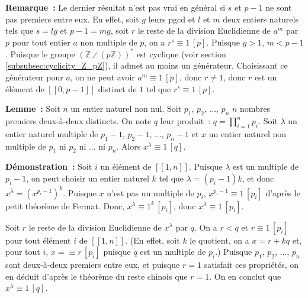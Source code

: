 \done

\medskip

\noindent\textbf{Remarque :} Le dernier résultat n'est pas vrai en général si $s$ et $p-1$ ne sont pas premiers entre eux.
    En effet, soit $g$ leurs pgcd et $l$ et $m$ deux entiers naturels tels que $s = l g$ et $p-1 = m g$, soit $r$ le reste de la division Euclidienne de $a^m$ par $p$ pour tout entier $a$ non multiple de $p$, on a $r^s \equiv 1 \, [p]$. 
    Puisque $g > 1$, $m < p-1$. 
    Puisque le groupe $(\mathbb{Z} \divslash (p \mathbb{Z}))^*$ est cyclique (voir section \ref{subsubsec:cyclicity_Z_pZ}), il admet au moins un générateur. 
    Choisissant ce générateur pour $a$, on ne peut avoir $a^m \equiv 1 \, [p]$, donc $r \neq 1$, donc $r$ est un élément de $[\![0, p-1]\!]$ distinct de $1$ tel que $r^s \equiv 1 \, [p]$.

\medskip

\noindent\textbf{Lemme :} Soit $n$ un entier naturel non nul.
    Soit $p_1$, $p_2$, ..., $p_n$ $n$ nombres premiers deux-à-deux distincts. 
    On note $q$ leur produit : $q = \prod_{i=1}^n p_i$.
    Soit $\lambda$ un entier naturel multiple de $p_1-1$, $p_2-1$, ..., $p_n-1$ et $x$ un entier naturel non multiple de $p_1$ ni $p_2$ ni ... ni $p_n$.
    Alors $x^\lambda \equiv 1 \, [q]$.

\medskip

\noindent\textbf{Démonstration :} Soit $i$ un élément de $[\![1, n]\!]$.
    Puisque $\lambda$ est un multiple de $p_i-1$, on peut choisir un entier naturel $k$ tel que $\lambda = (p_i-1) k$, et donc $x^\lambda = \left( x^{p_i-1} \right)^k$.
    Puisque $x$ n'est pas un multiple de $p_i$, $x^{p_i-1} \equiv 1 \, [p_i]$ d'après le petit théorème de Fermat.
    Donc, $x^\lambda \equiv 1^k \, [p_i]$, donc $x^\lambda \equiv 1 \, [p_i]$.

    Soit $r$ le reste de la division Euclidienne de $x^\lambda$ par $q$. 
    On a $r < q$ et $r \equiv 1 \, [p_i]$ pour tout élément $i$ de $[\![1, n]\!]$. 
    (En effet, soit $k$ le quotient, on a $x = r + k q$ et, pour tout $i$, $x = \equiv r \, [p_i]$ puisque $q$ est un multiple de $p_i$.)
    Puisque $p_1$, $p_2$, ..., $p_n$ sont deux-à-deux premiers entre eux, et puisque $r = 1$ satisfait ces propriétés, on en déduit d'après le théorème du reste chinois que $r = 1$.
    On en conclut que $x^\lambda \equiv 1 \, [q]$.

    \done
